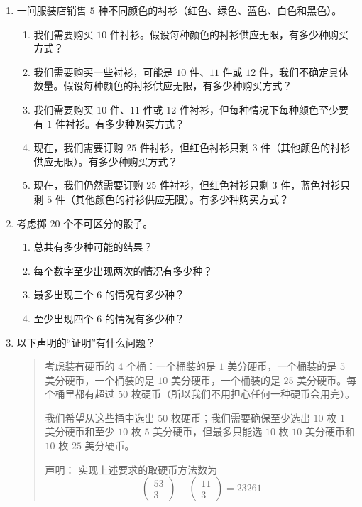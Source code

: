 \begin{enumerate}[label=(\arabic*)]
    \item 一间服装店销售 $5$ 种不同颜色的衬衫（红色、绿色、蓝色、白色和黑色）。
          \begin{enumerate}[label=(\alph*)]
              \item 我们需要购买 $10$ 件衬衫。假设每种颜色的衬衫供应无限，有多少种购买方式？
              \item 我们需要购买一些衬衫，可能是 $10$ 件、$11$ 件或 $12$ 件，我们不确定具体数量。假设每种颜色的衬衫供应无限，有多少种购买方式？
              \item 我们需要购买 $10$ 件、$11$ 件或 $12$ 件衬衫，但每种情况下每种颜色至少要有 $1$ 件衬衫。有多少种购买方式？
              \item 现在，我们需要订购 $25$ 件衬衫，但红色衬衫只剩 $3$ 件（其他颜色的衬衫供应无限）。有多少种购买方式？
              \item 现在，我们仍然需要订购 $25$ 件衬衫，但红色衬衫只剩 $3$ 件，蓝色衬衫只剩 $5$ 件（其他颜色的衬衫供应无限）。有多少种购买方式？
          \end{enumerate}
    \item 考虑掷 $20$ 个不可区分的骰子。
          \begin{enumerate}[label=(\alph*)]
              \item 总共有多少种可能的结果？
              \item 每个数字至少出现两次的情况有多少种？
              \item 最多出现三个 $6$ 的情况有多少种？
              \item 至少出现四个 $6$ 的情况有多少种？
          \end{enumerate}
    \item 以下声明的``证明''有什么问题？
          \begin{quotation}
              考虑装有硬币的 $4$ 个桶：一个桶装的是 $1$ 美分硬币，一个桶装的是 $5$ 美分硬币，一个桶装的是 $10$ 美分硬币，一个桶装的是 $25$ 美分硬币。每个桶里都有超过 $50$ 枚硬币（所以我们不用担心任何一种硬币会用完）。

              我们希望从这些桶中选出 $50$ 枚硬币；我们需要确保至少选出 $10$ 枚 $1$ 美分硬币和至少 $10$ 枚 $5$ 美分硬币，但最多只能选 $10$ 枚 $10$ 美分硬币和 $10$ 枚 $25$ 美分硬币。

              \begin{questions}{声明：}
                  实现上述要求的取硬币方法数为
                  \[\begin{pmatrix}53\\3\end{pmatrix}-\begin{pmatrix}11\\3\end{pmatrix}=23261\]
              \end{questions}


\end{quotation}
\end{enumerate}
